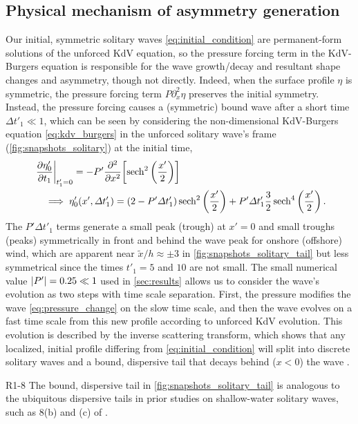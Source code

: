 \documentclass{jfm}
\begin{document}
\subsection{\label{sec:physical_reason} Physical mechanism of asymmetry
generation}
Our initial, symmetric solitary waves \cref{eq:initial_condition} are
permanent-form solutions of the unforced KdV equation, so the pressure
forcing term in the KdV-Burgers equation is responsible for the wave
growth/decay and resultant shape changes and asymmetry, though not
directly.
Indeed, when the surface profile $\eta$ is symmetric, the pressure
forcing term $P \partial_x^2 \eta$ preserves the initial symmetry.
Instead, the pressure forcing causes a (symmetric) bound wave after a
short time $\Delta t'_1 \ll 1$, which can be seen by considering the
non-dimensional KdV-Burgers equation \cref{eq:kdv_burgers} in the
unforced solitary wave's frame (\cref{fig:snapshots_solitary}) at the
initial time,
\begin{align}
  &\eval{\pdv{\eta'_0}{t_1}}_{t'_1=0} = -P' \pdv[2]{x} \bqty{
  \sech^2\pqty{\frac{x'}{2}}}
  \\
  &\quad \implies \eta'_0(x', \Delta t'_1) =
  (2-P'\Delta t'_1) \sech^2\pqty{\frac{x'}{2}}
  +
  P' \Delta t'_1 \frac{3}{2}\sech^4\pqty{\frac{x'}{2}}
  \,.
  \label{eq:pressure_change}
\end{align}
The $P'\Delta t'_1$ terms generate a small peak (trough) at $x'=0$ and
small troughs (peaks) symmetrically in front and behind the wave peak
for onshore (offshore) wind, which are apparent near $\tilde{x}/h
\approx \pm 3$ in \cref{fig:snapshots_solitary_tail} but less
symmetrical since the times $t'_1 = 5$ and $10$ are not small.
The small numerical value $\abs{P'} = 0.25 \ll 1$ used in
\cref{sec:results} allows us to consider the wave's evolution as two
steps with time scale separation.
First, the pressure modifies the wave \cref{eq:pressure_change} on the
slow time scale, and then the wave evolves on a fast time scale from
this new profile according to unforced KdV evolution.
This evolution is described by the inverse scattering transform, which
shows that any localized, initial profile differing from
\cref{eq:initial_condition} will split into discrete solitary waves and
a bound, dispersive tail that decays behind ($x<0$) the wave
\citep[\eg][]{mei2005nonlinear}.
\begin{LineLabel}{R1-8}
The bound, dispersive tail in \cref{fig:snapshots_solitary_tail} is
analogous to the ubiquitous dispersive tails in prior studies on
shallow-water solitary waves, such as \figsname{} 8(b) and (c) of
\citet{hammack1974korteweg}.
\end{LineLabel}
\end{document}
